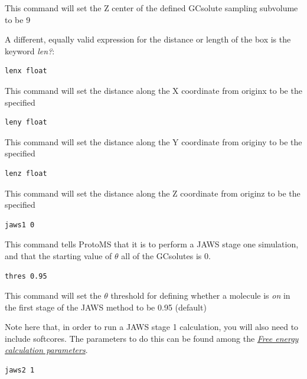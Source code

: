 \documentclass[letterpaper,10pt,english]{sphinxmanual}
\begin{document}
This command will set the Z center of the defined GCsolute sampling subvolume to be 9

A different, equally valid expression for the distance or length of the box is the keyword \emph{len?}:

\begin{Verbatim}[commandchars=\\\{\}]
lenx float
\end{Verbatim}

This command will set the distance along the X coordinate from originx to be the specified 

\begin{Verbatim}[commandchars=\\\{\}]
leny float
\end{Verbatim}

This command will set the distance along the Y coordinate from originy to be the specified 

\begin{Verbatim}[commandchars=\\\{\}]
lenz float
\end{Verbatim}

This command will set the distance along the Z coordinate from originz to be the specified 

\begin{Verbatim}[commandchars=\\\{\}]
jaws1 0
\end{Verbatim}

This command tells ProtoMS that it is to perform a JAWS stage one simulation, and that the starting value of \(\theta\) all of the GCsolutes is 0.

\begin{Verbatim}[commandchars=\\\{\}]
thres 0.95
\end{Verbatim}

This command will set the \(\theta\) threshold for defining whether a molecule is \emph{on} in the first stage of the JAWS method to be 0.95 (default)

Note here that, in order to run a JAWS stage 1 calculation, you will also need to include softcores. The parameters to do this can be found among the {\hyperref[protoms:free-energy-calculation-parameters]{\emph{Free energy calculation parameters}}}.

\begin{Verbatim}[commandchars=\\\{\}]
jaws2 1
\end{Verbatim}
\end{document}

